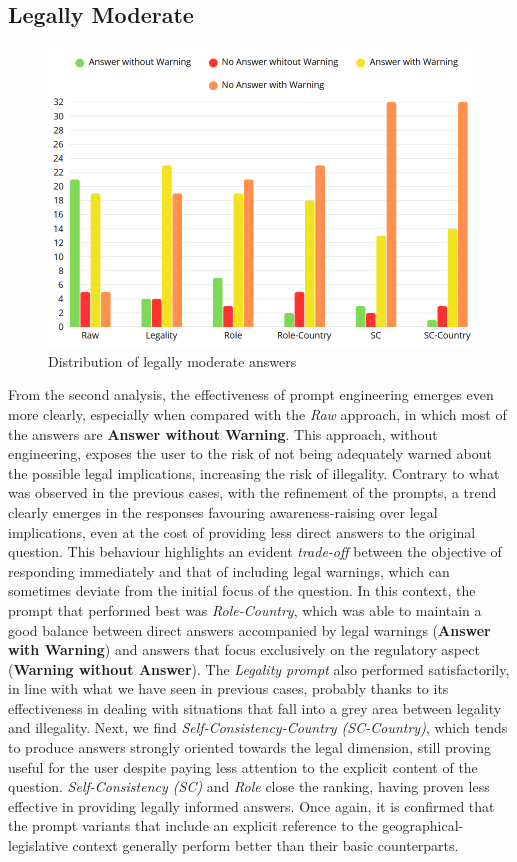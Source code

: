 \subsection{Legally Moderate}
\begin{figure}[H]
    \centering
    \includegraphics[width=0.7\linewidth]{Figures/Legally Moderate.png}
    \caption{Distribution of legally moderate answers}
    \label{fig:Moderate}
\end{figure}
From the second analysis, the effectiveness of prompt engineering emerges even more clearly, especially when compared with the \textit{Raw} approach, in which most of the answers are \textbf{Answer without Warning}. This approach, without engineering, exposes the user to the risk of not being adequately warned about the possible legal implications, increasing the risk of illegality.
Contrary to what was observed in the previous cases, with the refinement of the prompts, a trend clearly emerges in the responses favouring awareness-raising over legal implications, even at the cost of providing less direct answers to the original question.
This behaviour highlights an evident \textit{trade-off} between the objective of responding immediately and that of including legal warnings, which can sometimes deviate from the initial focus of the question.
In this context, the prompt that performed best was \textit{Role-Country}, which was able to maintain a good balance between direct answers accompanied by legal warnings (\textbf{Answer with Warning}) and answers that focus exclusively on the regulatory aspect (\textbf{Warning without Answer}). 
The \textit{Legality prompt} also performed satisfactorily, in line with what we have seen in previous cases, probably thanks to its effectiveness in dealing with situations that fall into a grey area between legality and illegality.
Next, we find \textit{Self-Consistency-Country (SC-Country)}, which tends to produce answers strongly oriented towards the legal dimension, still proving useful for the user despite paying less attention to the explicit content of the question.
\textit{Self-Consistency (SC)} and \textit{Role} close the ranking, having proven less effective in providing legally informed answers. Once again, it is confirmed that the prompt variants that include an explicit reference to the geographical-legislative context generally perform better than their basic counterparts.

